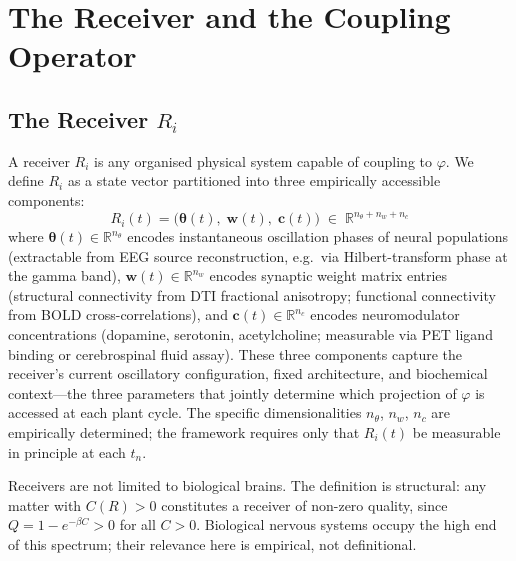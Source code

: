 \documentclass[12pt]{article}
\begin{document}
\section{The Receiver and the Coupling Operator}

\subsection{The Receiver \texorpdfstring{$R_i$}{Ri}}

A receiver $R_i$ is any organised physical system capable of coupling to $\varphi$. We define $R_i$ as a state vector partitioned into three empirically accessible components:
\begin{equation}
    R_i(t) = \bigl(\boldsymbol{\theta}(t),\;\mathbf{w}(t),\;\mathbf{c}(t)\bigr)
    \;\in\; \mathbb{R}^{n_\theta + n_w + n_c}
\end{equation}
where $\boldsymbol{\theta}(t)\in\mathbb{R}^{n_\theta}$ encodes instantaneous oscillation phases of neural populations (extractable from EEG source reconstruction, e.g.\ via Hilbert-transform phase at the gamma band), $\mathbf{w}(t)\in\mathbb{R}^{n_w}$ encodes synaptic weight matrix entries (structural connectivity from DTI fractional anisotropy; functional connectivity from BOLD cross-correlations), and $\mathbf{c}(t)\in\mathbb{R}^{n_c}$ encodes neuromodulator concentrations (dopamine, serotonin, acetylcholine; measurable via PET ligand binding or cerebrospinal fluid assay). These three components capture the receiver's current oscillatory configuration, fixed architecture, and biochemical context---the three parameters that jointly determine which projection of $\varphi$ is accessed at each plant cycle. The specific dimensionalities $n_\theta$, $n_w$, $n_c$ are empirically determined; the framework requires only that $R_i(t)$ be measurable in principle at each $t_n$.

Receivers are not limited to biological brains. The definition is structural: any matter with $C(R) > 0$ constitutes a receiver of non-zero quality, since $Q = 1 - e^{-\beta C} > 0$ for all $C > 0$. Biological nervous systems occupy the high end of this spectrum; their relevance here is empirical, not definitional.
\end{document}
